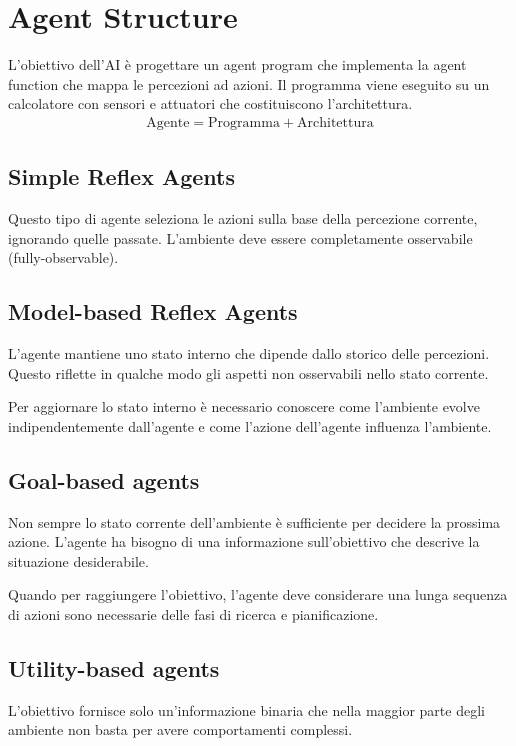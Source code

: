 \section{Agent Structure}
L'obiettivo dell'AI è progettare un agent program che implementa la agent function che mappa le percezioni ad azioni.
Il programma viene eseguito su un calcolatore con sensori e attuatori che costituiscono l'architettura.
%
\begin{align*}
  \text{Agente} = \text{Programma} + \text{Architettura}
\end{align*}

\subsection{Simple Reflex Agents}
Questo tipo di agente seleziona le azioni sulla base della percezione corrente, ignorando quelle passate.
L'ambiente deve essere completamente osservabile (fully-observable). 

\subsection{Model-based Reflex Agents}
L'agente mantiene uno stato interno che dipende dallo storico delle percezioni. 
Questo riflette in qualche modo gli aspetti non osservabili nello stato corrente.

Per aggiornare lo stato interno è necessario conoscere come l'ambiente evolve indipendentemente dall'agente
e come l'azione dell'agente influenza l'ambiente.

\subsection{Goal-based agents}
Non sempre lo stato corrente dell'ambiente è sufficiente per decidere la prossima azione.
L'agente ha bisogno di una informazione sull'obiettivo che descrive la situazione desiderabile.

Quando per raggiungere l'obiettivo, l'agente deve considerare una lunga sequenza di azioni sono necessarie
delle fasi di ricerca e pianificazione.

\subsection{Utility-based agents}
L'obiettivo fornisce solo un'informazione binaria che nella maggior parte degli ambiente non basta 
per avere comportamenti complessi.

